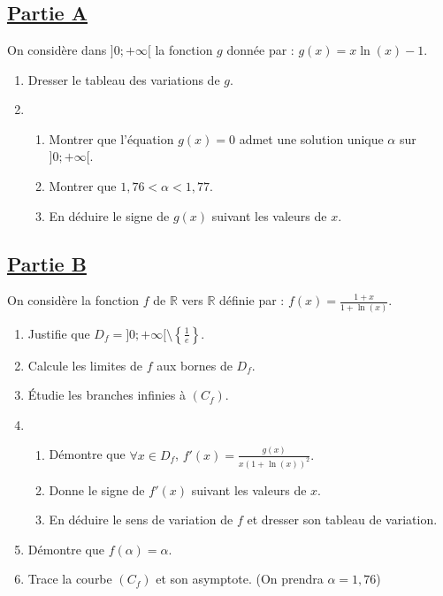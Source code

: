 \documentclass[12pt,a4paper]{article}
\begin{document}
    \section*{}

    \subsection*{\underline{\textbf{Partie A}}}

    On considère dans \( ]0; +\infty[ \) la fonction \( g \) donnée par :  \( g(x) = x \ln(x) - 1. \)

    \begin{enumerate}
        \item Dresser le tableau des variations de \( g \).
        \item
              \begin{enumerate}
                  \item Montrer que l’équation \( g(x) = 0 \) admet une solution unique \( \alpha \) sur \( ]0; +\infty[ \).
                  \item Montrer que \( 1,76 < \alpha < 1,77 \).
                  \item En déduire le signe de \( g(x) \) suivant les valeurs de \( x \).
              \end{enumerate}
    \end{enumerate}

    \subsection*{\underline{\textbf{Partie B}}}

    On considère la fonction \( f \) de \( \mathbb{R} \) vers \( \mathbb{R} \) définie par :
    \( f(x) = \frac{1 + x}{1 + \ln(x)}. \)

    \begin{enumerate}
        \item Justifie que \( D_f = ]0; +\infty[ \setminus \left\{ \frac{1}{e} \right\} \).
        \item Calcule les limites de \( f \) aux bornes de \( D_f \).
        \item Étudie les branches infinies à \( (C_f) \).
        \item
              \begin{enumerate}
                  \item Démontre que \( \forall x \in D_f \), \(  f'(x) = \frac{g(x)}{x (1 + \ln(x))^2}. \)
                  \item Donne le signe de \( f'(x) \) suivant les valeurs de \( x \).
                  \item En déduire le sens de variation de \( f \) et dresser son tableau de variation.
              \end{enumerate}
        \item Démontre que \( f(\alpha) = \alpha \).
        \item Trace la courbe \( (C_f) \) et son asymptote. (On prendra \( \alpha = 1,76 \))
    \end{enumerate}
\end{document}
